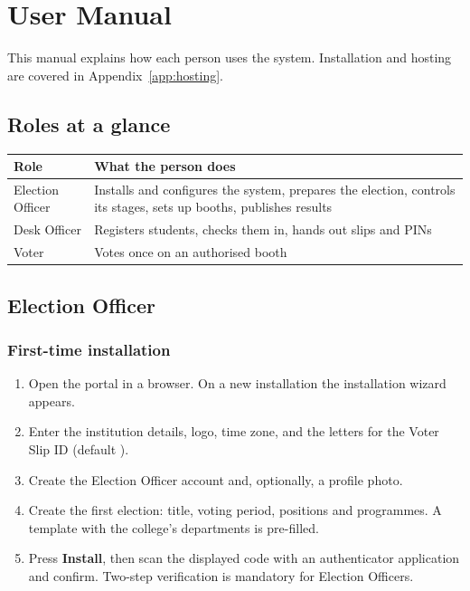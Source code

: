 \chapter{User Manual}
\label{chap:manual}

This manual explains how each person uses the system. Installation and hosting are covered in Appendix~\ref{app:hosting}.

\section{Roles at a glance}

\begin{center}
\begin{tabularx}{\linewidth}{@{}lX@{}}
\toprule
\textbf{Role} & \textbf{What the person does} \\
\midrule
Election Officer & Installs and configures the system, prepares the election, controls its stages, sets up booths, publishes results \\
Desk Officer & Registers students, checks them in, hands out slips and PINs \\
Voter & Votes once on an authorised booth \\
\bottomrule
\end{tabularx}
\end{center}

\section{Election Officer}

\subsection{First-time installation}

\begin{enumerate}
  \item Open the portal in a browser. On a new installation the installation wizard appears.
  \item Enter the institution details, logo, time zone, and the letters for the Voter Slip ID (default ).
  \item Create the Election Officer account and, optionally, a profile photo.
  \item Create the first election: title, voting period, positions and programmes. A template with the college's departments is pre-filled.
  \item Press \textbf{Install}, then scan the displayed code with an authenticator application and confirm. Two-step verification is mandatory for Election Officers.
\end{enumerate}

